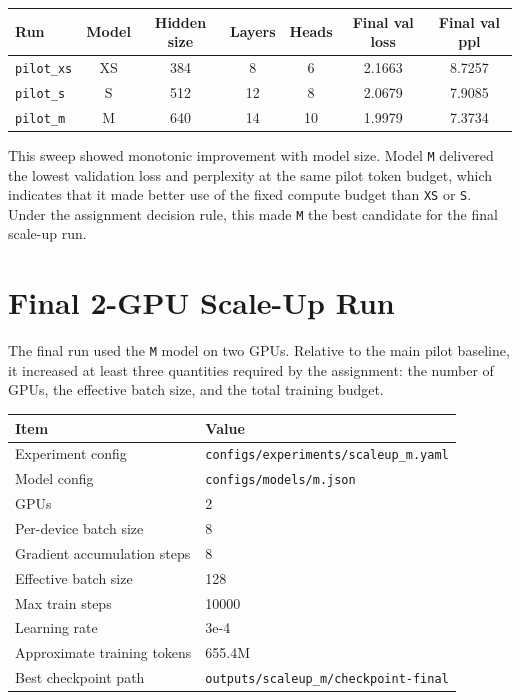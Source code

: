 \documentclass[11pt]{article}
\begin{document}
\begin{table}[H]
\centering
\small
\begin{tabular}{lcccccc}
\toprule
Run & Model & Hidden size & Layers & Heads & Final val loss & Final val ppl \\
\midrule
\texttt{pilot\_xs} & XS & 384 & 8 & 6 & 2.1663 & 8.7257 \\
\texttt{pilot\_s} & S & 512 & 12 & 8 & 2.0679 & 7.9085 \\
\texttt{pilot\_m} & M & 640 & 14 & 10 & 1.9979 & 7.3734 \\
\bottomrule
\end{tabular}
\end{table}

This sweep showed monotonic improvement with model size. Model \texttt{M} delivered the lowest validation loss and perplexity at the same pilot token budget, which indicates that it made better use of the fixed compute budget than \texttt{XS} or \texttt{S}. Under the assignment decision rule, this made \texttt{M} the best candidate for the final scale-up run.

\section{Final 2-GPU Scale-Up Run}

The final run used the \texttt{M} model on two GPUs. Relative to the main pilot baseline, it increased at least three quantities required by the assignment: the number of GPUs, the effective batch size, and the total training budget.

\begin{table}[H]
\centering
\begin{tabular}{ll}
\toprule
Item & Value \\
\midrule
Experiment config & \texttt{configs/experiments/scaleup\_m.yaml} \\
Model config & \texttt{configs/models/m.json} \\
GPUs & 2 \\
Per-device batch size & 8 \\
Gradient accumulation steps & 8 \\
Effective batch size & 128 \\
Max train steps & 10000 \\
Learning rate & 3e-4 \\
Approximate training tokens & 655.4M \\
Best checkpoint path & \texttt{outputs/scaleup\_m/checkpoint-final} \\
\bottomrule
\end{tabular}
\end{table}
\end{document}
